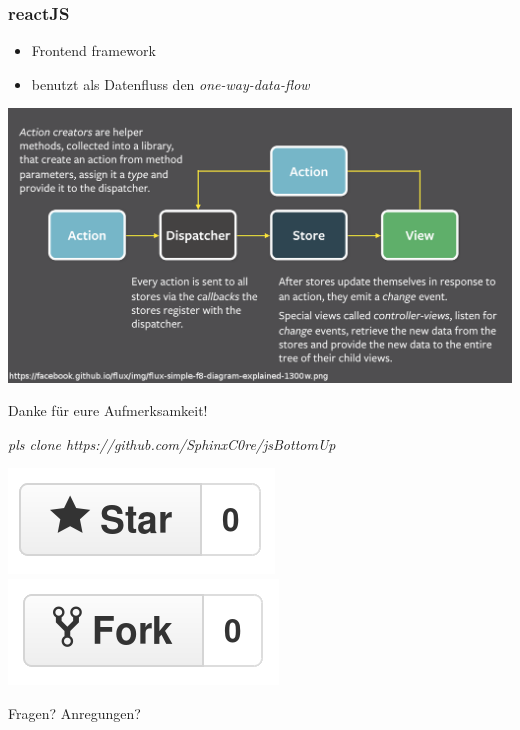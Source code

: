 \documentclass{beamer}
\begin{document}

\begin{frame}
\frametitle{reactJS}
\begin{itemize}
\item Frontend framework
\item benutzt als Datenfluss den \textit{one-way-data-flow}
\end{itemize}
\includegraphics[scale=0.22]{assets/flux.png}
\end{frame}






\begin{frame}
\Huge{\centerline{Danke für eure Aufmerksamkeit!}}

\begin{normalsize}

\centerline{\textit{pls clone https://github.com/SphinxC0re/jsBottomUp}}
\centerline{\includegraphics[scale=0.2]{assets/like_button.png} \includegraphics[scale=0.2]{assets/dislike_button.png}}
\end{normalsize}
\end{frame}

\begin{frame}
\Huge{\centerline{Fragen? Anregungen?}}
\end{frame}

\end{document}
